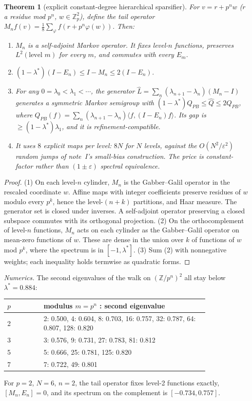 \documentclass[11pt]{article}
\newtheorem{theorem}{Theorem}[section]
\theoremstyle{definition}
\theoremstyle{remark}
\newcommand{\Z}{\mathbb Z}
\begin{document}
\begin{theorem}[explicit constant-degree hierarchical sparsifier]\label{thm:tail}
For $v=r+p^nw$ ($r$ a residue mod $p^n$, $w\in\Z_p^2$), define the \emph{tail operator} $M_nf(v)=\frac18\sum_\varphi f(r+p^n\varphi(w))$. Then:
\begin{enumerate}
\item $M_n$ is a self-adjoint Markov operator. It fixes level-$n$ functions, preserves $L^2(\text{level }m)$ for every $m$, and commutes with every $E_m$.
\item $(1-\lambda^*)(I-E_n)\le I-M_n\le2(I-E_n)$.
\item For any $0=\lambda_0<\lambda_1<\cdots$, the generator $\hat L=\sum_n(\lambda_{n+1}-\lambda_n)(M_n-I)$ generates a symmetric Markov semigroup with $(1-\lambda^*)Q_{PB}\le\hat Q\le2Q_{PB}$, where $Q_{PB}(f)=\sum_n(\lambda_{n+1}-\lambda_n)\langle f,(I-E_n)f\rangle$. Its gap is $\ge(1-\lambda^*)\lambda_1$, and it is refinement-compatible.
\item It uses $8$ explicit maps per level: $8N$ for $N$ levels, against the $O(N^2/\varepsilon^2)$ random jumps of note~I's small-bias construction. The price is constant-factor rather than $(1\pm\varepsilon)$ spectral equivalence.
\end{enumerate}
\end{theorem}

\begin{proof}
(1) On each level-$n$ cylinder, $M_n$ is the Gabber--Galil operator in the rescaled coordinate $w$. Affine maps with integer coefficients preserve residues of $w$ modulo every $p^k$, hence the level-$(n+k)$ partitions, and Haar measure. The generator set is closed under inverses. A self-adjoint operator preserving a closed subspace commutes with its orthogonal projection.
(2) On the orthocomplement of level-$n$ functions, $M_n$ acts on each cylinder as the Gabber--Galil operator on mean-zero functions of $w$. These are dense in the union over $k$ of functions of $w$ mod $p^k$, where the spectrum is in $[-1,\lambda^*]$.
(3) Sum (2) with nonnegative weights; each inequality holds termwise as quadratic forms.
\end{proof}

\noindent\emph{Numerics.} The second eigenvalues of the walk on $(\Z/p^n)^2$ all stay below $\lambda^*=0.884$:
\begin{center}
\begin{tabular}{lp{0.82\linewidth}}
\toprule
$p$ & modulus $m=p^n$ : second eigenvalue\\
\midrule
2 & 2: 0.500, 4: 0.604, 8: 0.703, 16: 0.757, 32: 0.787, 64: 0.807, 128: 0.820\\
3 & 3: 0.576, 9: 0.731, 27: 0.783, 81: 0.812\\
5 & 5: 0.666, 25: 0.781, 125: 0.820\\
7 & 7: 0.722, 49: 0.801\\
\bottomrule
\end{tabular}
\end{center}
For $p=2$, $N=6$, $n=2$, the tail operator fixes level-2 functions exactly, $[M_n,E_n]=0$, and its spectrum on the complement is $[-0.734,0.757]$.
\end{document}
